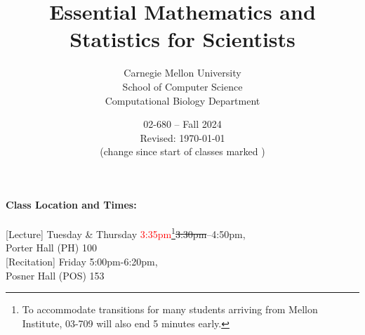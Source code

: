 \documentclass[12pt]{scrartcl}
\title{\large Essential Mathematics and Statistics for Scientists}\let\Title\@title
\subtitle{
{\small
Carnegie Mellon University\\
School of Computer Science\\
Computational Biology Department
}
\vskip-1cm}
\date{\large 02-680 -- Fall 2024\\ \vspace{1em}\small Revised: \today\\(change since start of classes marked \change{}{in orange})}
\author{}
\begin{document}

\maketitle





\paragraph{Class Location and Times:\\} 
\hspace*{2em}[Lecture] \hspace{1.1em}Tuesday \& Thursday \textcolor{red}{3:35pm}\footnote{To accommodate transitions for many students arriving from Mellon Institute, 03-709 will also end 5 minutes early.}\sout{3:30pm}--4:50pm, \\ \hspace*{8em} Porter Hall (PH) 100\vspace*{0.5em}\\
\hspace*{3em}[Recitation] Friday 5:00pm-6:20pm, \\ \hspace*{8em} Posner Hall (POS) 153
\end{document}
